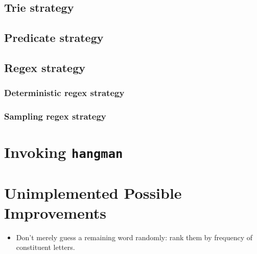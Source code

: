 \documentclass{article}
\begin{document}
\subsection{Trie strategy}
\subsection{Predicate strategy}
\subsection{Regex strategy}
\subsubsection{Deterministic regex strategy}
\subsubsection{Sampling regex strategy}
\section{Invoking \texttt{hangman}}
\section{Unimplemented Possible Improvements}
\begin{itemize}
\item Don't merely guess a remaining word randomly: rank them by
  frequency of constituent letters.
\end{itemize}
\end{document}
